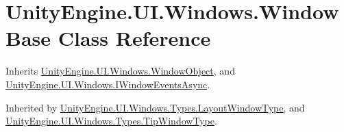\hypertarget{class_unity_engine_1_1_u_i_1_1_windows_1_1_window_base}{}\section{Unity\+Engine.\+U\+I.\+Windows.\+Window\+Base Class Reference}
\label{class_unity_engine_1_1_u_i_1_1_windows_1_1_window_base}


Inherits \hyperlink{class_unity_engine_1_1_u_i_1_1_windows_1_1_window_object}{Unity\+Engine.\+U\+I.\+Windows.\+Window\+Object}, and \hyperlink{interface_unity_engine_1_1_u_i_1_1_windows_1_1_i_window_events_async}{Unity\+Engine.\+U\+I.\+Windows.\+I\+Window\+Events\+Async}.



Inherited by \hyperlink{class_unity_engine_1_1_u_i_1_1_windows_1_1_types_1_1_layout_window_type}{Unity\+Engine.\+U\+I.\+Windows.\+Types.\+Layout\+Window\+Type}, and \hyperlink{class_unity_engine_1_1_u_i_1_1_windows_1_1_types_1_1_tip_window_type}{Unity\+Engine.\+U\+I.\+Windows.\+Types.\+Tip\+Window\+Type}.

